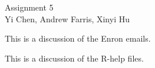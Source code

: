 \documentclass[12pt]{article}
\begin{document}
\begin{center} Assignment 5 \\ Yi Chen, Andrew Farris, Xinyi Hu \end{center}


\smallskip
This is a discussion of the Enron emails.





This is a discussion of the R-help files.
\end{document}
